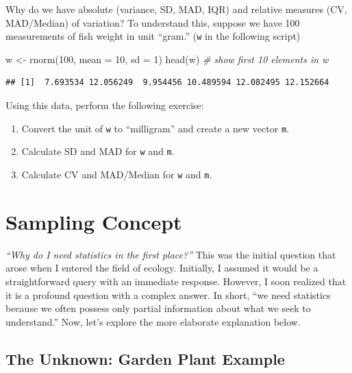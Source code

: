 \documentclass[
]{book}
\newenvironment{Shaded}{\begin{snugshade}}{\end{snugshade}}
\newcommand{\AttributeTok}[1]{\textcolor[rgb]{0.77,0.63,0.00}{#1}}
\newcommand{\CommentTok}[1]{\textcolor[rgb]{0.56,0.35,0.01}{\textit{#1}}}
\newcommand{\DecValTok}[1]{\textcolor[rgb]{0.00,0.00,0.81}{#1}}
\newcommand{\FunctionTok}[1]{\textcolor[rgb]{0.00,0.00,0.00}{#1}}
\newcommand{\NormalTok}[1]{#1}
\newcommand{\OtherTok}[1]{\textcolor[rgb]{0.56,0.35,0.01}{#1}}
\begin{document}
Why do we have absolute (variance, SD, MAD, IQR) and relative measures (CV, MAD/Median) of variation? To understand this, suppose we have 100 measurements of fish weight in unit ``gram.'' (\texttt{w} in the following script)

\begin{Shaded}
\begin{Highlighting}[]
\NormalTok{w }\OtherTok{\textless{}{-}} \FunctionTok{rnorm}\NormalTok{(}\DecValTok{100}\NormalTok{, }\AttributeTok{mean =} \DecValTok{10}\NormalTok{, }\AttributeTok{sd =} \DecValTok{1}\NormalTok{)}
\FunctionTok{head}\NormalTok{(w) }\CommentTok{\# show first 10 elements in w}
\end{Highlighting}
\end{Shaded}

\begin{verbatim}
## [1]  7.693534 12.056249  9.954456 10.489594 12.082495 12.152664
\end{verbatim}

Using this data, perform the following exercise:

\begin{enumerate}
\def\labelenumi{\arabic{enumi}.}
\item
  Convert the unit of \texttt{w} to ``milligram'' and create a new vector \texttt{m}.
\item
  Calculate SD and MAD for \texttt{w} and \texttt{m}.
\item
  Calculate CV and MAD/Median for \texttt{w} and \texttt{m}.
\end{enumerate}

\hypertarget{sampling-concept}{%
\chapter{Sampling Concept}\label{sampling-concept}}

\emph{``Why do I need statistics in the first place?''} This was the initial question that arose when I entered the field of ecology. Initially, I assumed it would be a straightforward query with an immediate response. However, I soon realized that it is a profound question with a complex answer. In short, ``we need statistics because we often possess only partial information about what we seek to understand.'' Now, let's explore the more elaborate explanation below.

\hypertarget{the-unknown-garden-plant-example}{%
\section{The Unknown: Garden Plant Example}\label{the-unknown-garden-plant-example}}
\end{document}

